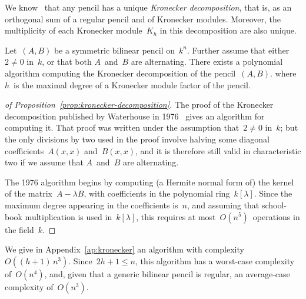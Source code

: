\documentclass{lms}
\begin{document}
We know~\cite[§3]{inventiones1976waterhouse}
that any pencil has a unique \emph{Kronecker decomposition},
that is, as an orthogonal sum of a regular pencil and of Kronecker modules.
Moreover, the multiplicity of each Kronecker module~$K_h$ in this
decomposition are also unique.

\begin{prop}\label{prop:kronecker-decomposition}
Let~$(A, B)$ be a symmetric bilinear pencil on~$k^n$.
Further assume that either~$2 ≠ 0$ in~$k$,
or that both $A$~and~$B$ are alternating.
There exists a polynomial algorithm computing the Kronecker decomposition
of the pencil~$(A, B)$.
where $h$~is the maximal degree of a Kronecker module factor of the pencil.
\end{prop}
\begin{proof}[of Proposition~\ref{prop:kronecker-decomposition}]
The proof of the Kronecker decomposition published
by Waterhouse in 1976~\cite[Theorem 3.1]{inventiones1976waterhouse}
gives an algorithm for computing it.
That proof was written under the assumption that~$2 ≠ 0$ in~$k$;
but the only divisions by two used in the proof
involve halving some diagonal coefficients~$A(x,x)$ and~$B(x,x)$,
and it is therefore still valid in characteristic two
if we assume that $A$~and~$B$ are alternating.

The 1976 algorithm begins by computing (a Hermite normal form of)
the kernel of the matrix~$A - λ B$,
with coefficients in the polynomial ring~$k[λ]$.
Since the maximum degree appearing in the coefficients is~$n$,
and assuming that school-book multiplication is used in~$k[λ]$,
this requires at most~$O(n^5)$~operations in the field~$k$.
\end{proof}

We give in Appendix~\ref{ap:kronecker} an algorithm
with complexity~$O((h+1)\,n^3)$.
Since~$2h+1 ≤ n$, this algorithm has a worst-case complexity of~$O(n^4)$,
and, given that a generic bilinear pencil is regular,
an average-case complexity of~$O(n^3)$.
\end{document}
